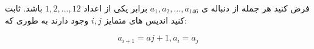\exercise
فرض کنید هر جمله از دنباله ی
$a_1, a_2, ..., a_{146}$
برابر یکی از اعداد
$1, 2, ..., 12$
باشد. ثابت کنید اندیس های متمایز
$i, j$
وجود دارند به طوری که:

$$a_{i+1} = a{j+1}, a_i = a_j$$